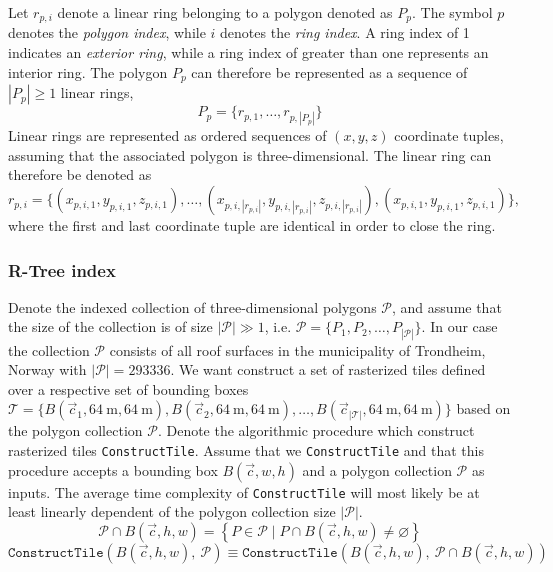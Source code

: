 Let $r_{p,i}$ denote a linear ring belonging to a polygon denoted as $P_p$.
The symbol $p$ denotes the \textit{polygon index}, while $i$ denotes the \textit{ring index}.
A ring index of 1 indicates an \textit{exterior ring}, while a ring index of greater than one represents an interior ring.
The polygon $P_p$ can therefore be represented as a sequence of $|P_p| \geq 1$ linear rings,
%
\begin{equation*}
P_p = \{ r_{p,1}, \dots, r_{p, |P_p|}\}
\end{equation*}
%
Linear rings are represented as ordered sequences of $(x, y, z)$ coordinate tuples, assuming that the associated polygon is three-dimensional.
The linear ring can therefore be denoted as
%
\begin{equation*}
  r_{p,i}
  =
  \{
    (x_{p,i,1}, y_{p,i,1}, z_{p,i,1}),
    \dots,
    (x_{p,i,|r_{p, i}|}, y_{p,i,|r_{p, i}|}, z_{p,i,|r_{p, i}|}),
    (x_{p,i,1}, y_{p,i,1}, z_{p,i,1})
  \},
\end{equation*}
%
where the first and last coordinate tuple are identical in order to close the ring.

\subsubsection{R-Tree index}

Denote the indexed collection of three-dimensional polygons $\mathcal{P}$, and assume that the size of the collection is of size $|\mathcal{P}| \gg 1$, i.e. $\mathcal{P} = \{P_1, P_2, \dots, P_{|\mathcal{P}|} \}$.
In our case the collection $\mathcal{P}$ consists of all roof surfaces in the municipality of Trondheim, Norway with $|\mathcal{P}| = \num{293336}$.
We want construct a set of rasterized tiles defined over a respective set of bounding boxes $\mathcal{T} = \{B(\vec{c}_1, \SI{64}{\meter}, \SI{64}{\meter}), B(\vec{c}_2, \SI{64}{\meter}, \SI{64}{\meter}),\allowbreak \dots,\allowbreak B(\vec{c}_{|\mathcal{T}|}, \SI{64}{\meter}, \SI{64}{\meter}) \}$ based on the polygon collection $\mathcal{P}$.
Denote the algorithmic procedure which construct rasterized tiles \texttt{ConstructTile}.
Assume that we \texttt{ConstructTile} and that this procedure accepts a bounding box $B(\vec{c}, w, h)$ and a polygon collection $\mathcal{P}$ as inputs.
The average time complexity of \texttt{ConstructTile} will most likely be at least linearly dependent of the polygon collection size $|\mathcal{P}|$.
%
\begin{equation*}
  \mathcal{P} \cap B(\vec{c}, h, w)
  =
  \left\{
    P \in \mathcal{P} \mid P \cap B(\vec{c}, h, w) \neq \varnothing
  \right\}
\end{equation*}
%
\begin{equation*}
  \texttt{ConstructTile}(B(\vec{c}, h, w),~\mathcal{P})
  \equiv
  \texttt{ConstructTile}(B(\vec{c}, h, w),~\mathcal{P} \cap B(\vec{c}, h, w))
\end{equation*}

